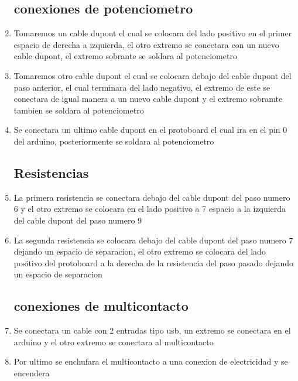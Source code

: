 \begin{enumerate}
\subsection{conexiones de potenciometro}
    \item Tomaremos un cable dupont el cual se colocara del lado positivo en el primer espacio de derecha a izquierda, el otro extremo se conectara con un nuevo cable dupont, el extremo sobrante se soldara al potenciometro 
    \item Tomaremos otro cable dupont el cual se colocara debajo del cable dupont del paso anterior, el cual terminara del lado negativo, el extremo de este se conectara de igual manera a un nuevo cable dupont y el extremo sobramte tambien se soldara al potenciometro
    \item Se conectara un ultimo cable dupont en el protoboard el cual ira en el pin 0 del arduino, posteriormente se soldara al potenciometro
\subsection{Resistencias}
    \item La primera resistencia se conectara debajo del cable dupont del paso numero 6 y el otro extremo se colocara en el lado positivo a 7 espacio a la izquierda del cable dupont del paso numero 9
    \item La segunda resistencia se colocara debajo del cable dupont del paso numero 7 dejando un espacio de separacion, el otro extremo se colocara del lado positivo del protoboard a la derecha de la resistencia del paso pasado dejando un espacio de separacion
\subsection{conexiones de multicontacto}
    \item Se conectara un cable con 2 entradas tipo usb, un extremo se conectara en el arduino y el otro extremo se conectara al multicontacto
    \item Por ultimo se enchufara el multicontacto a una conexion de electricidad y se encendera 
\end{enumerate}